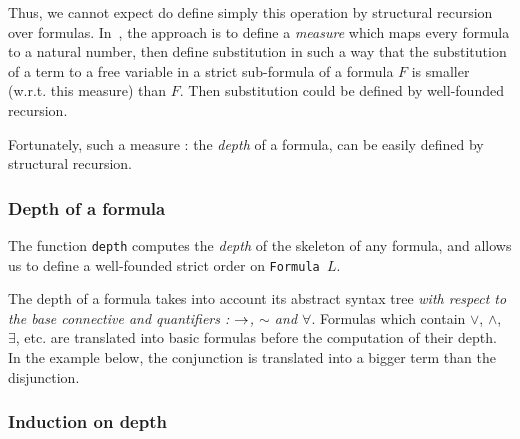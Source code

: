 Thus, we cannot expect do define simply this operation by 
structural recursion over formulas. 
In~\cite{Goedel}, the approach is to define a \emph{measure}
which maps every formula to a natural number, then define substitution in such a way that the substitution of a term to a free variable in a strict sub-formula  of a formula $F$ is smaller
(w.r.t. this measure) than $F$. 
Then substitution could be defined by well-founded recursion.

Fortunately, such a measure : the \emph{depth} of a formula,
can be easily defined by structural recursion.





\subsubsection{Depth of a formula}

The function \texttt{depth} computes the \emph{depth} of the 
 skeleton of any formula, and allows us to define a well-founded strict order on 
\texttt{Formula $L$}.


\begin{remark}
  The depth of a formula takes into account its abstract syntax tree \emph{with respect to the base connective and quantifiers : $\mbox{$\rightarrow$}$, $\sim$ and $\forall$}.
    Formulas which contain $\vee$, $\wedge$, $\exists$, etc. are translated into
    basic formulas before the computation of their depth. In the example below, 
the conjunction is translated into a bigger term than the disjunction.


\end{remark}

\subsubsection{Induction on depth}







